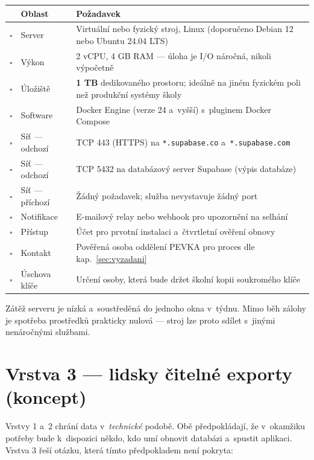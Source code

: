 \documentclass[11pt,a4paper]{article}
\begin{document}
\begin{center}
\begin{tabularx}{\textwidth}{@{}p{0.7cm}p{3.6cm}X@{}}
\toprule
& \textbf{Oblast} & \textbf{Požadavek} \\
\midrule
$\square$ & Server & Virtuální nebo fyzický stroj, Linux (doporučeno Debian 12 nebo Ubuntu 24.04 LTS) \\
$\square$ & Výkon & 2 vCPU, 4 GB RAM --- úloha je I/O náročná, nikoli výpočetně \\
$\square$ & Úložiště & \textbf{1 TB} dedikovaného prostoru; ideálně na jiném fyzickém poli než produkční systémy školy \\
$\square$ & Software & Docker Engine (verze 24 a~vyšší) s~pluginem Docker Compose \\
$\square$ & Síť --- odchozí & TCP 443 (HTTPS) na \texttt{*.supabase.co} a~\texttt{*.supabase.com} \\
$\square$ & Síť --- odchozí & TCP 5432 na databázový server Supabase (výpis databáze) \\
$\square$ & Síť --- příchozí & Žádný požadavek; služba nevystavuje žádný port \\
$\square$ & Notifikace & E-mailový relay nebo webhook pro upozornění na selhání \\
$\square$ & Přístup & Účet pro prvotní instalaci a~čtvrtletní ověření obnovy \\
$\square$ & Kontakt & Pověřená osoba oddělení PEVKA pro proces dle kap.~\ref{sec:vyzadani} \\
$\square$ & Úschova klíče & Určení osoby, která bude držet školní kopii soukromého klíče \\
\bottomrule
\end{tabularx}
\end{center}

\medskip
Zátěž serveru je nízká a~soustředěná do jednoho okna v~týdnu. Mimo běh zálohy je spotřeba
prostředků prakticky nulová --- stroj lze proto sdílet s~jinými nenáročnými službami.

\newpage

\section{Vrstva 3 --- lidsky čitelné exporty (koncept)}
\label{sec:vrstva3}

Vrstvy 1 a~2 chrání data v~\emph{technické} podobě. Obě předpokládají, že v~okamžiku potřeby
bude k~dispozici někdo, kdo umí obnovit databázi a~spustit aplikaci. Vrstva 3 řeší otázku, která
tímto předpokladem není pokryta:
\end{document}
